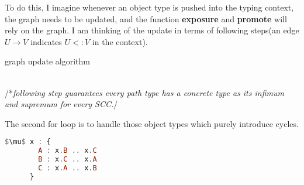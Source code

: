 \documentclass{article}
\newcommand{\LineComment}[1]{\\/*\textit{#1}\hfill*/}
\begin{document}
\begin{enumerate}
  \linenumbers
  To do this, I imagine whenever an object type is pushed into the typing context, the
  graph needs to be updated, and the function \textbf{exposure} and \textbf{promote}
  will rely on the graph. I am thinking of the update in terms of following steps(an
  edge $U \to V$ indicates $U <: V$ in the context).

  \nolinenumbers
  \begin{algorithm}[H]
    \caption{graph update algorithm}
    \begin{algorithmic}[1]
      \LineComment{following step guarantees every path type has a concrete type as
        its infimum and supremum for every SCC.}
    \end{algorithmic}
  \end{algorithm}

  \linenumbers
  The second for loop is to handle those object types which purely introduce cycles.

  \nolinenumbers
  \begin{multicols}{2}
    \begin{lstlisting}[language=Haskell, mathescape=true]
      $\mu$ x : {
        A : x.B .. x.C
        B : x.C .. x.A
        C : x.A .. x.B
      }
    \end{lstlisting}

    \columnbreak
    \begin{figure}[H]
      \centering
    \end{figure}
  \end{multicols}


\end{enumerate}
\end{document}
